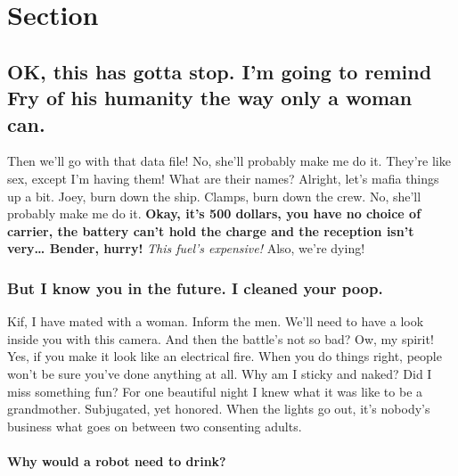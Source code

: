 \hypertarget{section-2.2}{%
\section{Section}\label{section-2.2}}

\hypertarget{ok-this-has-gotta-stop.-im-going-to-remind-fry-of-his-humanity-the-way-only-a-woman-can.}{%
\subsection{OK, this has gotta stop. I'm going to remind Fry of his
humanity the way only a woman
can.}\label{ok-this-has-gotta-stop.-im-going-to-remind-fry-of-his-humanity-the-way-only-a-woman-can.}}

Then we'll go with that data file! No, she'll probably make me do it.
They're like sex, except I'm having them! What are their names? Alright,
let's mafia things up a bit. Joey, burn down the ship. Clamps, burn down
the crew. No, she'll probably make me do it. \textbf{Okay, it's 500
dollars, you have no choice of carrier, the battery can't hold the
charge and the reception isn't very\ldots{} Bender, hurry!} \emph{This
fuel's expensive!} Also, we're dying!

\hypertarget{but-i-know-you-in-the-future.-i-cleaned-your-poop.}{%
\subsubsection{But I know you in the future. I cleaned your
poop.}\label{but-i-know-you-in-the-future.-i-cleaned-your-poop.}}

Kif, I have mated with a woman. Inform the men. We'll need to have a
look inside you with this camera. And then the battle's not so bad? Ow,
my spirit! Yes, if you make it look like an electrical fire. When you do
things right, people won't be sure you've done anything at all. Why am I
sticky and naked? Did I miss something fun? For one beautiful night I
knew what it was like to be a grandmother. Subjugated, yet honored. When
the lights go out, it's nobody's business what goes on between two
consenting adults.

\hypertarget{why-would-a-robot-need-to-drink}{%
\paragraph{\texorpdfstring{Why would a robot need to
drink?\newline}{Why would a robot need to drink?}}\label{why-would-a-robot-need-to-drink}}


